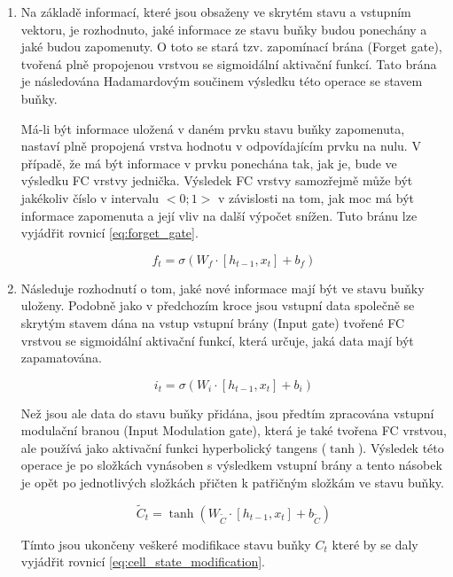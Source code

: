 \begin{enumerate}

\item Na základě informací, které jsou obsaženy ve skrytém stavu a vstupním vektoru, je rozhodnuto, jaké informace ze stavu buňky budou ponechány a jaké budou zapomenuty.
O toto se stará tzv. zapomínací brána (Forget gate), tvořená plně propojenou vrstvou se sigmoidální aktivační funkcí.
Tato brána je následována Hadamardovým součinem výsledku této operace se stavem buňky.

Má-li být informace uložená v daném prvku stavu buňky zapomenuta, nastaví plně propojená vrstva hodnotu v odpovídajícím prvku na nulu.
V případě, že má být informace v prvku ponechána tak, jak je, bude ve výsledku FC vrstvy jednička.
Výsledek FC vrstvy samozřejmě může být jakékoliv číslo v intervalu \(<0;1>\) v závislosti na tom, jak moc má být informace zapomenuta a její vliv na další výpočet snížen.
Tuto bránu lze vyjádřit rovnicí \ref{eq:forget_gate}. 

\begin{equation}
f_t = \sigma(W_f \cdot [h_{t-1}, x_t] + b_f)
\label{eq:forget_gate}
\end{equation}


\item Následuje rozhodnutí o tom, jaké nové informace mají být ve stavu buňky uloženy.
Podobně jako v předchozím kroce jsou vstupní data společně se skrytým stavem dána na vstup vstupní brány (Input gate) tvořené FC vrstvou se sigmoidální aktivační funkcí, která určuje, jaká data mají být zapamatována.

\begin{equation}
i_t = \sigma(W_i \cdot [h_{t-1}, x_t] + b_i)
\label{eq:input gate}
\end{equation}

Než jsou ale data do stavu buňky přidána, jsou předtím zpracována vstupní modulační branou (Input Modulation gate), která je také tvořena FC vrstvou, ale používá jako aktivační funkci hyperbolický tangens (\(\tanh\)).
Výsledek této operace je po složkách vynásoben s výsledkem vstupní brány a tento násobek je opět po jednotlivých složkách přičten k patřičným složkám ve stavu buňky.

\begin{equation}
\widetilde{C}_t = \tanh(W_{\widetilde{C}} \cdot [h_{t-1}, x_t] + b_{\widetilde{C}})
\label{eq:input_modulation_gate}
\end{equation}

Tímto jsou ukončeny veškeré modifikace stavu buňky \(C_t\) které by se daly vyjádřit rovnicí \ref{eq:cell_state_modification}.


\end{enumerate}
